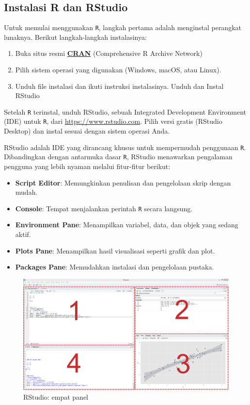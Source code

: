 \documentclass[
  oneside]{book}
\begin{document}
\subsection*{Instalasi R dan RStudio}\label{instalasi-r-dan-rstudio}

Untuk memulai menggunakan \texttt{R}, langkah pertama adalah
menginstal perangkat lunaknya. Berikut langkah-langkah instalasinya:

\begin{enumerate}
\def\labelenumi{\arabic{enumi}.}
\item
  Buka situs resmi \href{https://cran.r-project.org}{\textbf{CRAN}}
  (Comprehensive R Archive Network)
\item
  Pilih sistem operasi yang digunakan (Windows, macOS, atau Linux).
\item
  Unduh file instalasi dan ikuti instruksi instalasinya. Unduh dan
  Instal RStudio
\end{enumerate}

Setelah \texttt{R} terinstal, unduh RStudio, sebuah Integrated
Development Environment (IDE) untuk \texttt{R}, dari
\url{https://www.rstudio.com}. Pilih versi gratis (RStudio Desktop) dan
instal sesuai dengan sistem operasi Anda.

RStudio adalah IDE yang dirancang khusus untuk mempermudah penggunaan
\texttt{R}. Dibandingkan dengan antarmuka dasar \texttt{R},
RStudio menawarkan pengalaman pengguna yang lebih nyaman melalui
fitur-fitur berikut:

\begin{itemize}
\item
  \textbf{Script Editor}: Memungkinkan penulisan dan pengelolaan skrip
  dengan mudah.
\item
  \textbf{Console}: Tempat menjalankan perintah \texttt{R} secara
  langsung.
\item
  \textbf{Environment Pane}: Menampilkan variabel, data, dan objek yang
  sedang aktif.
\item
  \textbf{Plots Pane}: Menampilkan hasil visualisasi seperti grafik dan
  plot.
\item
  \textbf{Packages Pane}: Memudahkan instalasi dan pengelolaan pustaka.
\end{itemize}

\begin{figure}[h]

{\centering \includegraphics[width=0.8\linewidth]{images/rstudio} 

}

\caption{RStudio: empat panel}\label{fig:unnamed-chunk-6}
\end{figure}
\end{document}
